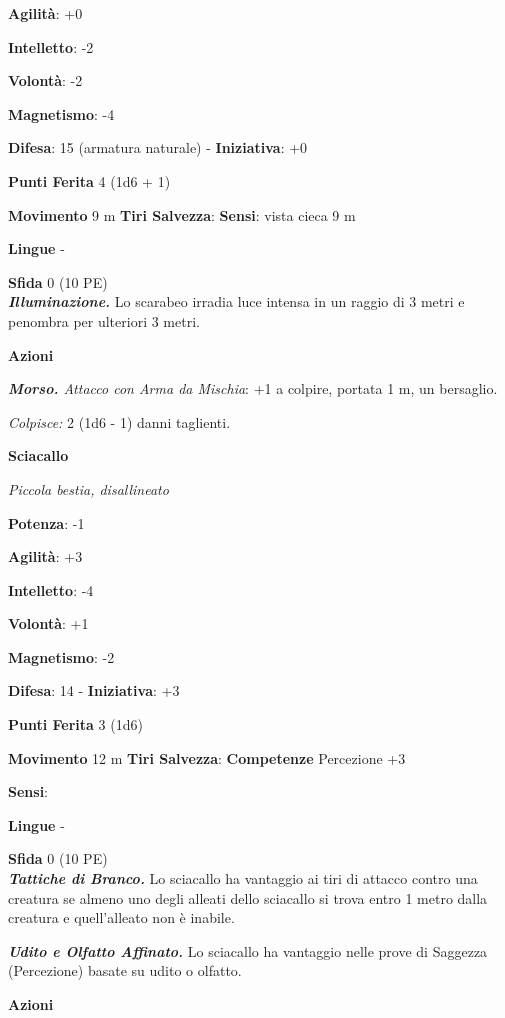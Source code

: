 \begin{multicols}{2}
\textbf{Agilità}: +0

\textbf{Intelletto}: -2

\textbf{Volontà}: -2

\textbf{Magnetismo}: -4

\textbf{Difesa}: 15 (armatura naturale) - \textbf{Iniziativa}: +0

\textbf{Punti Ferita} 4 (1d6 + 1)

\textbf{Movimento} 9 m
\textbf{Tiri Salvezza}:
\textbf{Sensi}: vista cieca 9 m

\textbf{Lingue} -

\textbf{Sfida} 0 (10 PE)\smallskip\\

\emph{\textbf{Illuminazione.}} Lo scarabeo irradia luce intensa in un
raggio di 3 metri e penombra per ulteriori 3 metri.

\smallskip\textbf{Azioni}

\emph{\textbf{Morso.} Attacco con Arma da Mischia}: +1 a colpire,
portata 1 m, un bersaglio.

\emph{Colpisce:} 2 (1d6 - 1) danni taglienti.

\textbf{Sciacallo}

\emph{Piccola bestia, disallineato}

\textbf{Potenza}: -1

\textbf{Agilità}: +3

\textbf{Intelletto}: -4

\textbf{Volontà}: +1

\textbf{Magnetismo}: -2

\textbf{Difesa}: 14 - \textbf{Iniziativa}: +3

\textbf{Punti Ferita} 3 (1d6)

\textbf{Movimento} 12 m
\textbf{Tiri Salvezza}:
\textbf{Competenze} Percezione +3

\textbf{Sensi}: 

\textbf{Lingue} -

\textbf{Sfida} 0 (10 PE)\smallskip\\

\emph{\textbf{Tattiche di Branco.}} Lo sciacallo ha vantaggio ai tiri di
attacco contro una creatura se almeno uno degli alleati dello sciacallo
si trova entro 1 metro dalla creatura e quell'alleato non è inabile.

\emph{\textbf{Udito e Olfatto Affinato.}} Lo sciacallo ha vantaggio
nelle prove di Saggezza (Percezione) basate su udito o olfatto.

\smallskip\textbf{Azioni}


\end{multicols}
